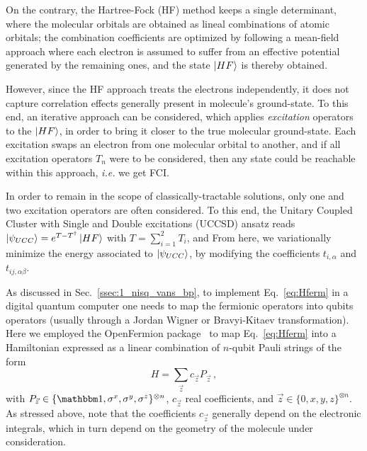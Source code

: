 On the contrary, the Hartree-Fock (HF) method keeps a single determinant, where the molecular orbitals are obtained as lineal combinations of atomic orbitals; the combination coefficients are optimized by following a mean-field approach where each electron is assumed to suffer from an effective potential generated by the remaining ones, and the state $\ket{HF}$ is thereby obtained.

However, since the HF approach treats the electrons independently, it does not capture correlation effects generally present in molecule's ground-state. To this end, an iterative approach can be considered, which applies \textit{excitation} operators to the $\ket{HF}$, in order to bring it closer to the true molecular ground-state. Each excitation swaps an electron from one molecular orbital to another, and if all excitation operators $T_n$ were to be considered, then any state could be reachable within this approach, \textit{i.e.} we get FCI.

In order to remain in the scope of classically-tractable solutions, only one and two excitation operators are often considered. To this end, the Unitary Coupled Cluster with Single and Double excitations (UCCSD) ansatz reads $\ket{\psi_{UCC}} = e^{T-T^\dagger}\ket{HF}$ with
$T = \sum_{i=1}^2 T_i$, and 
From here, we variationally minimize the energy associated to $\ket{\psi_{UCC}}$, by modifying the coefficients $t_{i,\alpha}$ and $t_{ij,\alpha\beta}$.

As discussed in Sec.~\ref{ssec:1_nisq_vans_bp}, to implement Eq.~\ref{eq:Hferm} in a digital quantum computer one needs to map the fermionic operators into qubits operators (usually through a Jordan Wigner or Bravyi-Kitaev transformation). Here we employed the OpenFermion package~\cite{mcclean2019openfermion} to map Eq.~\ref{eq:Hferm} into a Hamiltonian expressed as a linear combination of $n$-qubit Pauli strings of the form
\begin{equation}\label{eq:HfermJW}
    H=\sum_{\vec{z}} c_{\vec{z}} P_{\vec{z}}\,,
\end{equation}
with $P_{\vec{z}}\in\{\id,\sigma^x,\sigma^y,\sigma^z\}^{\otimes n}$, $c_{\vec{z}}$ real coefficients, and $\vec{z}\in\{0,x,y,z\}^{\otimes n}$. As stressed above, note that the coefficients $c_{\vec{z}}$ generally depend on the electronic integrals, which in turn depend on the geometry of the molecule under consideration.

